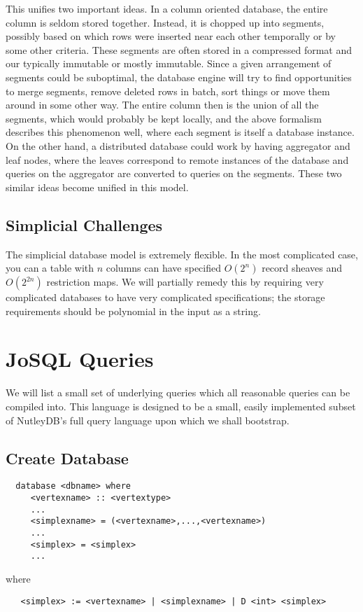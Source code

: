 \documentclass[a4paper,12pt]{article}
\theoremstyle{mydef}
\theoremstyle{myremark}
\begin{document}
This unifies two important ideas.
In a column oriented database, the entire column is seldom stored together.
Instead, it is chopped up into segments, possibly based on which rows were inserted near each other temporally or by some other criteria.
These segments are often stored in a compressed format and our typically immutable or mostly immutable.  
Since a given arrangement of segments could be suboptimal, the database engine will try to find opportunities to merge segments, remove deleted rows in batch, sort things or move them around in some other way.
The entire column then is the union of all the segments, which would probably be kept locally, and the above formalism describes this phenomenon well, where each segment is itself a database instance.  
On the other hand, a distributed database could work by having aggregator and leaf nodes, where the leaves correspond to remote instances of the database and queries on the aggregator are converted to queries on the segments.
These two similar ideas become unified in this model.


\subsection{Simplicial Challenges}

The simplicial database model is extremely flexible.
In the most complicated case, you can a table with $n$ columns can have specified $O(2^n)$ record sheaves and $O(2^{2n})$ restriction maps.
We will partially remedy this by requiring very complicated databases to have very complicated specifications; the storage requirements should be polynomial in the input as a string.


\section{JoSQL Queries}

We will list a small set of underlying queries which all reasonable queries can be compiled into.  
This language is designed to be a small, easily implemented subset of NutleyDB's full query language upon which we shall bootstrap.

\subsection{Create Database}

\begin{verbatim}
  database <dbname> where
     <vertexname> :: <vertextype>
     ...
     <simplexname> = (<vertexname>,...,<vertexname>)
     ...
     <simplex> = <simplex>
     ...
\end{verbatim}
where
\begin{verbatim}
   <simplex> := <vertexname> | <simplexname> | D <int> <simplex>
\end{verbatim}
\end{document}
